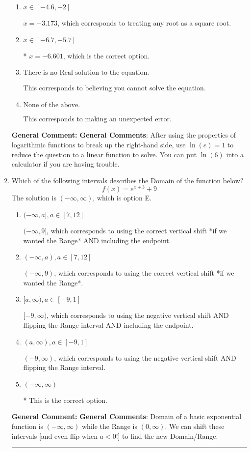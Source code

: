 \documentclass{extbook}[14pt]
\newcommand{\litem}[1]{\item #1

\rule{\textwidth}{0.4pt}}
\begin{document}
\begin{enumerate}
{\begin{enumerate}[label=\Alph*.]
$x = -1.676$, which corresponds to thinking you need to take the natural log of on the left before reducing.
\item \( x \in [-4.6, -2] \)

$x = -3.173$, which corresponds to treating any root as a square root.
\item \( x \in [-6.7, -5.7] \)

* $x = -6.601$, which is the correct option.
\item \( \text{There is no Real solution to the equation.} \)

This corresponds to believing you cannot solve the equation.
\item \( \text{None of the above.} \)

This corresponds to making an unexpected error.
\end{enumerate}

\textbf{General Comment:} \textbf{General Comments}: After using the properties of logarithmic functions to break up the right-hand side, use $\ln(e) = 1$ to reduce the question to a linear function to solve. You can put $\ln(6)$ into a calculator if you are having trouble.
}
\litem{
Which of the following intervals describes the Domain of the function below?
\[ f(x) = e^{x+3}+9 \]The solution is \( (-\infty, \infty) \), which is option E.\begin{enumerate}[label=\Alph*.]
\item \( (-\infty, a], a \in [7, 12] \)

$(-\infty, 9]$, which corresponds to using the correct vertical shift *if we wanted the Range* AND including the endpoint.
\item \( (-\infty, a), a \in [7, 12] \)

$(-\infty, 9)$, which corresponds to using the correct vertical shift *if we wanted the Range*.
\item \( [a, \infty), a \in [-9, 1] \)

$[-9, \infty)$, which corresponds to using the negative vertical shift AND flipping the Range interval AND including the endpoint.
\item \( (a, \infty), a \in [-9, 1] \)

$(-9, \infty)$, which corresponds to using the negative vertical shift AND flipping the Range interval.
\item \( (-\infty, \infty) \)

* This is the correct option.
\end{enumerate}

\textbf{General Comment:} \textbf{General Comments}: Domain of a basic exponential function is $(-\infty, \infty)$ while the Range is $(0, \infty)$. We can shift these intervals [and even flip when $a<0$!] to find the new Domain/Range.
}
\end{enumerate}
\end{document}
